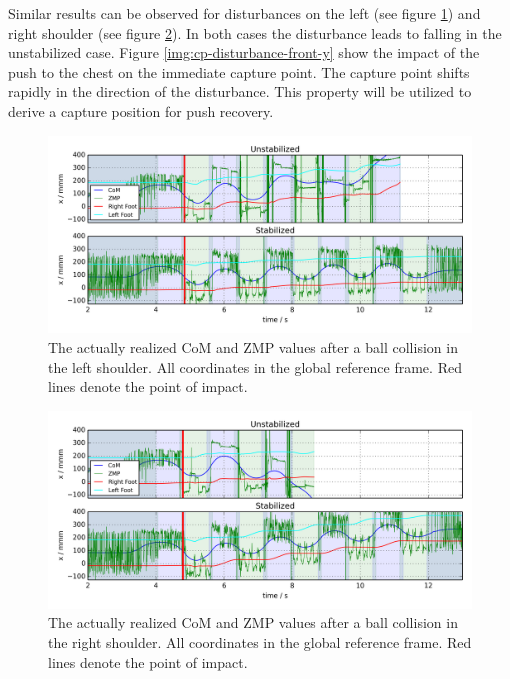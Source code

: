 \documentclass[english,ngerman]{KITreprt}
\begin{document}
Similar results can be observed for disturbances on the left (see figure
\ref{img:disturbed-left-straight-x}) and right shoulder (see figure
\ref{img:disturbed-right-straight-x}). In both cases the disturbance
leads to falling in the unstabilized case. Figure
\ref{img:cp-disturbance-front-y} show the impact of the push to the
chest on the immediate capture point. The capture point shifts rapidly
in the direction of the disturbance. This property will be utilized to
derive a capture position for push recovery.

\begin{figure}[hbt]
\vspace*{-1em}
\includegraphics[width=\textwidth,resolution=300]{images/disturbed_left_straight_x.png}
\caption{The actually realized CoM and ZMP values after a ball collision in the left shoulder.
All coordinates in the global reference frame. Red lines denote the point of impact.}
\label{img:disturbed-left-straight-x}
\end{figure}

\begin{figure}[hbt]
\vspace*{-1em}
\includegraphics[width=\textwidth,resolution=300]{images/disturbed_right_straight_x.png}
\caption{The actually realized CoM and ZMP values after a ball collision in the right shoulder.
All coordinates in the global reference frame. Red lines denote the point of impact.}
\label{img:disturbed-right-straight-x}
\end{figure}
\end{document}
